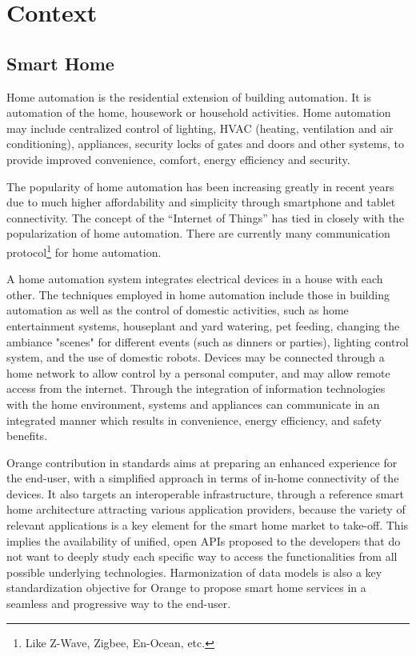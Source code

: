 
\section{Context}
\subsection{Smart Home}

Home automation \cite{homeautomation} is the residential extension of building automation. It is automation of the home, housework or household activities. Home automation may include centralized control of lighting, HVAC (heating, ventilation and air conditioning), appliances, security locks of gates and doors and other systems, to provide improved convenience, comfort, energy efficiency and security.

The popularity of home automation has been increasing greatly in recent years due to much higher affordability and simplicity through smartphone and tablet connectivity. The concept of the ``Internet of Things'' has tied in closely with the popularization of home automation. There are currently many communication protocol\footnote{Like Z-Wave, Zigbee, En-Ocean, etc.} for home automation.

A home automation system \cite{homeautomation1} integrates electrical devices in a house with each other. The techniques employed in home automation include those in building automation as well as the control of domestic activities, such as home entertainment systems, houseplant and yard watering, pet feeding, changing the ambiance "scenes" for different events (such as dinners or parties), lighting control system, and the use of domestic robots. Devices may be connected through a home network to allow control by a personal computer, and may allow remote access from the internet. Through the integration of information technologies with the home environment, systems and appliances can communicate in an integrated manner which results in convenience, energy efficiency, and safety benefits.

Orange contribution in standards aims at preparing an enhanced experience for the end-user, with a simplified approach in terms of in-home connectivity of the devices. It also targets an interoperable infrastructure, through a reference smart home architecture attracting various application providers, because the variety of relevant applications is a key element for the smart home market to take-off. This implies the availability of unified, open APIs proposed to the developers that do not want to deeply study each specific way to access the functionalities from all possible underlying technologies. Harmonization of data models is also a key standardization objective for Orange to propose smart home services in a seamless and progressive way to the end-user.
